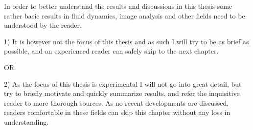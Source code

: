 In order to better understand the results and discussions in this thesis some rather basic results in fluid dynamics, image analysis and other fields need to be understood by the reader. 

1)
It is however not the focus of this thesis and as such I will try to be as brief as possible, and an experienced reader can safely skip to the next chapter.


OR


2)
As the focus of this thesis is experimental I will not go into great detail, but try to briefly motivate and quickly summarize results, and refer the inquisitive reader to more thorough sources. As no recent developments are discussed, readers comfortable in these fields can skip this chapter without any loss in understanding.
